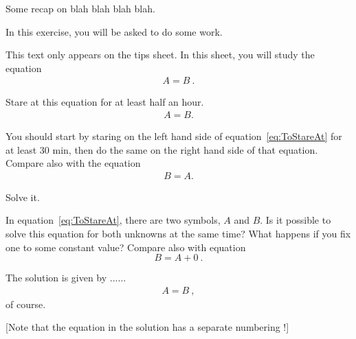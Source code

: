 \documentclass[11pt,a4paper]{article}
\begin{document}
\MakeUebungHeader


\begin{tips}
Some recap on blah blah blah blah.
\end{tips}



In this exercise, you will be asked to do some work.

\begin{onlytipssheet}
  This text only appears on the tips sheet. In this sheet, you will study the equation
  \begin{align}
    A = B\ .
  \end{align}
\end{onlytipssheet}

\begin{exenumerate}
\item Stare at this equation for at least half an hour.
  \begin{align}
    \label{eq:ToStareAt}
    A = B.
  \end{align}

  \begin{tips}
    You should start by staring on the left hand side of equation~\eqref{eq:ToStareAt} for
    at least 30 min, then do the same on the right hand side of that equation. Compare
    also with the equation
    \begin{align}
      B = A.
    \end{align}
  \end{tips}
  
\item Solve it.

  \begin{tips}
    In equation~\eqref{eq:ToStareAt}, there are two symbols, $A$ and $B$. Is it possible
    to solve this equation for both unknowns at the same time? What happens if you fix one
    to some constant value? Compare also with equation
    \begin{equation}
      \label{eq:blah}
      B = A + 0\ .
    \end{equation}
  \end{tips}

  \begin{loesung}%
    The solution is given by ...... 
    \begin{align}
      A=B\ ,
    \end{align}
    of course.

    [Note that the equation in the solution has a separate numbering !]
  \end{loesung}
\end{exenumerate}
\end{document}
